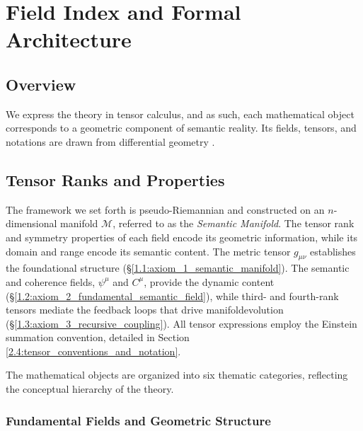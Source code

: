 \chapter{Field Index and Formal Architecture}
\label{2:field_index_and_formal_architecture}


\section{Overview}
\label{2.1:overview}

We express the theory in tensor calculus, and as such, each mathematical object corresponds to a geometric component of semantic reality. Its fields, tensors, and notations are drawn from differential geometry \autocite{Riemann1868, Lee2003}.


\section{Tensor Ranks and Properties}
\label{2.2:tensor_ranks_and_properties}

The framework we set forth is pseudo-Riemannian and constructed on an \(n\)-dimensional manifold \(\mathcal{M}\), referred to as the \textit{Semantic Manifold}. The tensor rank and symmetry properties of each field encode its geometric information, while its domain and range encode its semantic content. The metric tensor \(g_{\mu\nu}\) establishes the foundational structure (\S\ref{1.1:axiom_1_semantic_manifold}). The semantic and coherence fields, \(\psi^\mu\) and \(C^\mu\), provide the dynamic content (\S\ref{1.2:axiom_2_fundamental_semantic_field}), while third- and fourth-rank tensors mediate the feedback loops that drive manifoldevolution (\S\ref{1.3:axiom_3_recursive_coupling}). All tensor expressions employ the Einstein summation convention, detailed in Section \ref{2.4:tensor_conventions_and_notation}.

The mathematical objects are organized into six thematic categories, reflecting the conceptual hierarchy of the theory.


\subsection{Fundamental Fields and Geometric Structure}
\label{2.2.1:fundamental_fields_and_geometric_structure}

